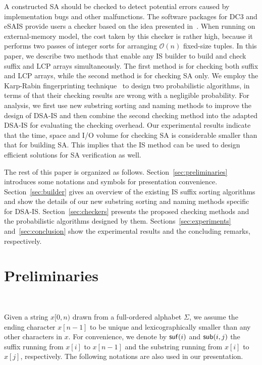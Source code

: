 \documentclass[10pt,journal,compsoc]{IEEEtran}
\begin{document}
A constructed SA should be checked to detect potential errors caused by implementation bugs and other malfunctions. The software packages for DC3 and eSAIS provide users a checker based on the idea presented in~\cite{Dementiev2008a}. When running on external-memory model, the cost taken by this checker is rather high, because it performs two passes of integer sorts for arranging $\mathcal{O}(n)$ fixed-size tuples. In this paper, we describe two methods that enable any IS builder to build and check suffix and LCP arrays simultaneously. The first method is for checking both suffix and LCP arrays, while the second method is for checking SA only. We employ the Karp-Rabin fingerprinting technique~\cite{Karp1987} to design two probabilistic algorithms, in terms of that their checking results are wrong with a negligible probability. For analysis, we first use new substring sorting and naming methods to improve the design of DSA-IS and then combine the second checking method into the adapted DSA-IS for evaluating the checking overhead. Our experimental results indicate that the time, space and I/O volume for checking SA is considerable smaller than that for building SA. This implies that the IS method can be used to design efficient solutions for SA verification as well.

The rest of this paper is organized as follows. Section~\ref{sec:preliminaries} introduces some notations and symbols for presentation convenience. Section~\ref{sec:builder} gives an overview of the existing IS suffix sorting algorithms and show the details of our new substring sorting and naming methods specific for DSA-IS. Section~\ref{sec:checkers} presents the proposed checking methods and the probabilistic algorithms designed by them. Sections~\ref{sec:experiments} and~\ref{sec:conclusion} show the experimental results and the concluding remarks, respectively.

\section{Preliminaries}~\label{sec:preliminaries}

Given a string $x[0,n)$ drawn from a full-ordered alphabet $\Sigma$, we assume the ending character $x[n - 1]$ to be unique and lexicographically smaller than any other characters in $x$. For convenience, we denote by ${\sf suf}(i)$ and ${\sf sub}(i, j)$ the suffix running from $x[i]$ to $x[n-  1]$ and the substring running from $x[i]$ to $x[j]$, respectively. The following notations are also used in our presentation.
\end{document}
